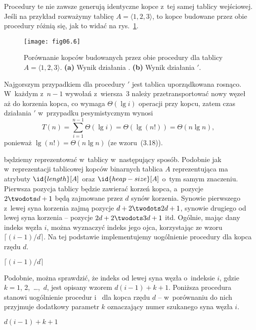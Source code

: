 \problems


\subproblem %
Procedury te nie zawsze generują identyczne kopce z~tej samej tablicy wejściowej. Jeśli na przykład rozważymy tablicę $A=\langle1,2,3\rangle$, to kopce budowane przez obie procedury różnią się, jak to widać na rys.~\ref{fig:6-1(a)}.
\begin{figure}[ht]
	\begin{center}
		\texttt{[image: fig06.6]}
	\end{center}
	\caption{Porównanie kopców budowanych przez obie procedury dla tablicy $A=\langle1,2,3\rangle$. {\sffamily\bfseries(a)} Wynik działania . {\sffamily\bfseries(b)} Wynik działania $'$.} \label{fig:6-1(a)}
\end{figure}

\subproblem %
Najgorszym przypadkiem dla procedury $'$ jest tablica uporządkowana rosnąco. W~każdym z~$n-1$ wywołań  z~wiersza~3 należy przetransportować nowy węzeł aż do korzenia kopca, co wymaga $\Theta(\lg i)$ operacji przy  kopcu, zatem czas działania $'$ w~przypadku pesymistycznym wynosi
\[
	T(n) = \sum_{i=1}^{n-1}\Theta(\lg i) = \Theta(\lg(n!)) = \Theta(n\lg n),
\]
ponieważ $\lg(n!)=\Theta(n\lg n)$ (ze wzoru~(3.18)).


\subproblem %
 będziemy reprezentować w~tablicy w~następujący sposób. Podobnie jak w~reprezentacji tablicowej kopców binarnych tablica $A$ reprezentująca  ma atrybuty $\id{length}[A]$ oraz $\id{heap-size}[A]$ o~tym samym znaczeniu. Pierwsza pozycja tablicy będzie zawierać korzeń kopca, a~pozycje $2\twodots d+1$ będą zajmowane przez $d$ synów korzenia. Synowie pierwszego z~lewej syna korzenia zajmą pozycje $d+2\twodots2d+1$, synowie drugiego od lewej syna korzenia -- pozycje $2d+2\twodots3d+1$ itd. Ogólnie, mając dany indeks węzła $i$, można wyznaczyć indeks jego ojca, korzystając ze wzoru $\lceil(i-1)/d\rceil$. Na tej podstawie implementujemy uogólnienie procedury  dla kopca rzędu $d$.
\begin{codebox}
\zi	\Return $\lceil(i-1)/d\rceil$
\end{codebox}
Podobnie, można sprawdzić, że indeks  od lewej syna węzła o~indeksie $i$, gdzie $k=1$, 2,~\dots,~$d$, jest opisany wzorem $d(i-1)+k+1$. Poniższa procedura stanowi uogólnienie procedur  i~ dla kopca rzędu $d$ -- w~porównaniu do nich przyjmuje dodatkowy parametr $k$ oznaczający numer szukanego syna węzła $i$.
\begin{codebox}
\zi	\Return $d(i-1)+k+1$
\end{codebox}

